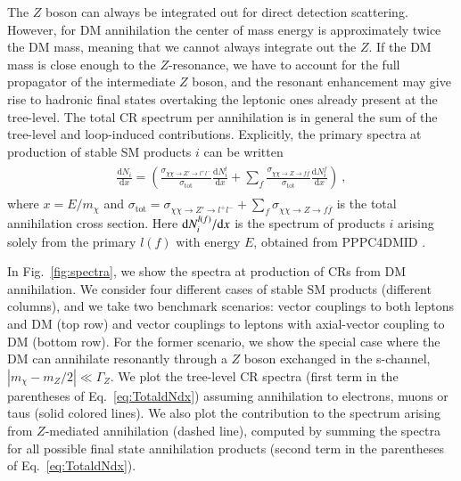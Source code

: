 \documentclass[final,5p,twocolumn]{elsarticle}
\newcommand{\dbd}[2]{\frac{\mathrm{d}#1}{\mathrm{d}#2}}
\begin{document}
The $Z$ boson can always be integrated out for direct detection scattering. However, for DM annihilation the center of mass energy is approximately twice the DM mass, meaning that we cannot always integrate out the $Z$. If the DM mass is close enough to the $Z$-resonance, we have to account for the full propagator of the intermediate $Z$ boson, and the resonant enhancement may give rise to hadronic final states overtaking the leptonic ones already present at the tree-level. The total CR spectrum per annihilation is in general the sum of the tree-level and loop-induced contributions. 
Explicitly, the primary spectra at production of  stable SM products $i$ can be written
\begin{align}\label{eq:TotaldNdx}
\begin{split}
\dbd{N_i}{x} =  \left(  \frac{\sigma_{\chi \chi \rightarrow Z' \rightarrow l^+ l^-}}{\sigma_\mathrm{tot}} \dbd{N_i^l}{x} + \sum_f  \frac{\sigma_{\chi \chi \rightarrow Z \rightarrow f\overline{f}}}{\sigma_\mathrm{tot}} \dbd{N_i^f}{x} \right) \ ,
\end{split}
\end{align}
where $x=E/m_\chi$ and $\sigma_{\mathrm{tot}}=\sigma_{\chi \chi \rightarrow Z' \rightarrow l^+ l^-} + \sum_f  \sigma_{\chi \chi \rightarrow Z \rightarrow f\overline{f}} $ is the total annihilation cross section. Here ${\rm d}N_i^{l(f)}/{\rm d} x$ is the spectrum of products $i$ arising solely from the primary $l(f)$ with energy $E$, obtained from \textsc{PPPC4DMID} \cite{Cirelli:2010xx,Ciafaloni:2010ti}.

In Fig.~\ref{fig:spectra}, we show the spectra at production of CRs from DM annihilation. We consider four different cases of stable SM products (different columns), and we take two benchmark scenarios: vector couplings to both leptons and DM (top row) and vector couplings to leptons with axial-vector coupling to DM (bottom row). For the former scenario, we show the special case where the DM can annihilate resonantly through a $Z$ boson exchanged in the s-channel, $| m_\chi - m_Z / 2 | \ll \Gamma_Z$. We plot the tree-level CR spectra (first term in the parentheses of Eq.~\eqref{eq:TotaldNdx}) assuming annihilation to electrons, muons or taus (solid colored lines). We also plot the contribution to the spectrum arising from $Z$-mediated annihilation (dashed line), computed by summing the spectra for all possible final state annihilation products (second term in the parentheses of Eq.~\eqref{eq:TotaldNdx}).
\end{document}
